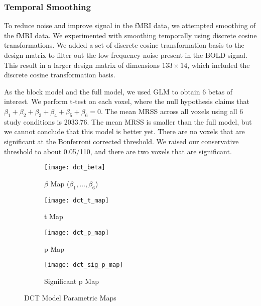 \subsubsection{Temporal Smoothing}

To reduce noise and improve signal in the fMRI data, we attempted smoothing of
the fMRI data. We experimented with smoothing temporally using discrete cosine
transformations. We added a set of discrete cosine transformation basis to the
design matrix to filter out the low frequency noise present in the BOLD
signal. This result in a larger design matrix of dimensions $133 \times 14$,
which included the discrete cosine transformation basis.

As the block model and the full model, we used GLM to obtain 6 betas of interest.
We perform t-test on each voxel, where the null hypothesis claims that  $\beta_1
+ \beta_2 + \beta_3 + \beta_4 + \beta_5 + \beta_6= 0$. The mean MRSS across all
voxels using all 6 study conditions is 2033.76. The mean MRSS is smaller than
the full model, but we cannot conclude that this model is better yet. There are no 
voxels that are significant at the Bonferroni corrected threshold. We raised our
conservative threshold to about 0.05/110, and there are two voxels that are
significant.

\begin{figure}[!h]
\begin{subfigure}{.5\textwidth}
  \centering
  \texttt{[image: dct\_beta]}
    \caption{$\beta$ Map ($\beta_1, \ldots, \beta_6$)}
\end{subfigure}%
\begin{subfigure}{.4\textwidth}
  \centering
  \texttt{[image: dct\_t\_map]}
  \caption{t Map}
\end{subfigure}
\begin{subfigure}{.5\textwidth}
  \centering
  \texttt{[image: dct\_p\_map]}
  \caption{p Map}
\end{subfigure}%
\begin{subfigure}{.5\textwidth}
  \centering
  \texttt{[image: dct\_sig\_p\_map]}
  \caption{Significant p Map} 
\end{subfigure}
\caption{DCT Model Parametric Maps\label{fig:dctMF}}
\end{figure}

